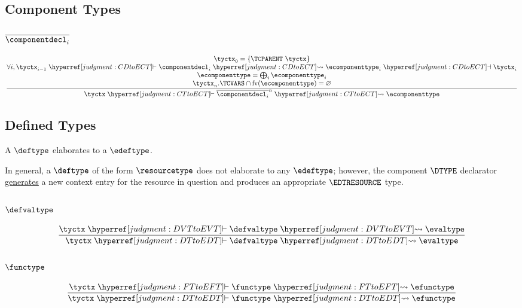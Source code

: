\subsection{Component Types}
\label{judgment:CTtoECT}

\subsubsection{$\overline{\componentdecl_i}$}
\[
  \frac{
    \begin{array}{@{}c@{}}
      \tyctx_0 = \{ \TCPARENT~\tyctx \}\\
      \forall i, \tyctx_{i-1} \vdashh!CDtoECT! \componentdecl_i \leadstoh!CDtoECT! \ecomponenttype_i \dashvh!CDtoECT! \tyctx_i\\
      \ecomponenttype = \bigoplus_i \ecomponenttype_i\\
      \tyctx_n.\TCVARS \cap \freeVars{\ecomponenttype} = \varnothing\\
    \end{array}
  }{
    \tyctx \vdashh!CTtoECT! \overline{\componentdecl_i}^n
    \leadstoh!CTtoECT! \ecomponenttype
  }
\]

\subsection{Defined Types}
\label{judgment:DTtoEDT}

A $\deftype$ elaborates to a $\edeftype$.

In general, a $\deftype$ of the form $\resourcetype$ does not
elaborate to any $\edeftype$; however, the component $\DTYPE$
declarator \hyperref[rule:CDatECT:DTYPE]{generates} a new context
entry for the resource in question and produces an appropriate
$\EDTRESOURCE$ type.

\subsubsection{$\defvaltype$}
\[
  \frac{
    \tyctx \vdashh!DVTtoEVT! \defvaltype \leadstoh!DVTtoEVT! \evaltype
  }{
    \tyctx \vdashh!DTtoEDT! \defvaltype \leadstoh!DTtoEDT! \evaltype
  }
\]

\subsubsection{$\functype$}
\[
  \frac{
    \tyctx \vdashh!FTtoEFT! \functype \leadstoh!FTtoEFT! \efunctype
  }{
    \tyctx \vdashh!DTtoEDT! \functype \leadstoh!DTtoEDT! \efunctype
  }
\]

